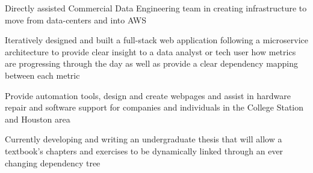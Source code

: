 \documentclass[letterpaper]{deedy-resume} %
\begin{document}
\begin{minipage}[t]{0.66\textwidth}
\begin{tightitemize}
\item Directly assisted Commercial Data Engineering team in creating infrastructure to move from data-centers and into AWS
\item Iteratively designed and built a full-stack web application following a microservice architecture to provide clear insight to a data analyst or tech user how metrics are progressing through the day as well as provide a clear dependency mapping between each metric
\end{tightitemize}

\sectionspace %




\begin{tightitemize}
\item Provide automation tools, design and create webpages and assist in hardware repair and software support for companies and individuals in the College Station and Houston area
\end{tightitemize}

\sectionspace %



\begin{tightitemize}
\item Currently developing and writing an undergraduate thesis that
will allow a textbook's chapters and exercises to be dynamically
linked through an ever changing dependency tree


\end{tightitemize}
\end{minipage}
\end{document}

